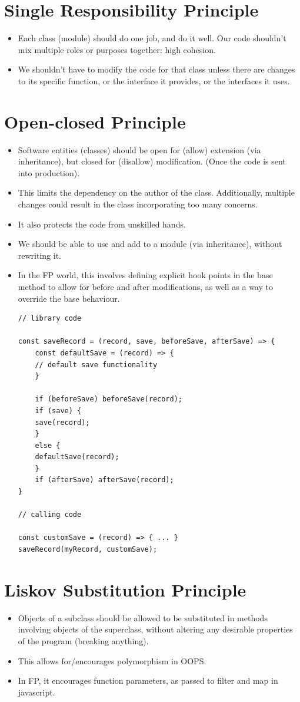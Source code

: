 \documentclass{report}
\begin{document}
\section{Single Responsibility Principle}
\begin{itemize}
\item Each class (module) should do one job, and do it well. Our code shouldn't mix multiple roles or purposes together: high cohesion.
\item We shouldn't have to modify the code for that class unless there are changes to its specific function, or the interface it provides, or the interfaces it uses.
\end{itemize}
\section{Open-closed Principle}
\begin{itemize}
\item Software entities (classes) should be open for (allow) extension (via inheritance), but closed for (disallow) modification. (Once the code is sent into production).
\item This limits the dependency on the author of the class. Additionally, multiple changes could result in the class incorporating too many concerns.
\item It also protects the code from unskilled hands.
\item We should be able to use and add to a module (via inheritance), without rewriting it.
\item In the FP world, this involves defining explicit hook points in the base method to allow for before and after modifications, as well as a way to override the base behaviour. 
\begin{lstlisting}
// library code

const saveRecord = (record, save, beforeSave, afterSave) => {
    const defaultSave = (record) => {
    // default save functionality
    }
    
    if (beforeSave) beforeSave(record);
    if (save) {
    save(record);
    }
    else {
    defaultSave(record);
    }
    if (afterSave) afterSave(record);
}
    
// calling code
    
const customSave = (record) => { ... }
saveRecord(myRecord, customSave);
\end{lstlisting}
\end{itemize}
\section{Liskov Substitution Principle}
\begin{itemize}
\item Objects of a subclass should be allowed to be substituted in methods involving objects of the superclass, without altering any desirable properties of the program (breaking anything).
\item This allows for/encourages polymorphism in OOPS.
\item In FP, it encourages function parameters, as passed to filter and map in javascript.
\end{itemize}
\end{document}
